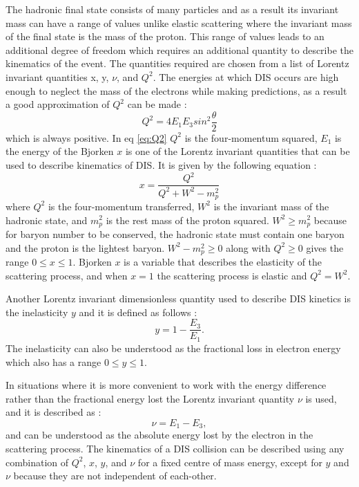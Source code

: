 \documentclass[journal, a4paper,11pt]{IEEEtran}
\begin{document}
The hadronic final state consists of many particles and as a result its invariant mass can have a range of values unlike elastic scattering where the invariant mass of the final state is the mass of the proton. This range of values leads to an additional degree of freedom which requires an additional quantity to describe the kinematics of the event. The quantities required are chosen from a list of Lorentz invariant quantities x, y, $\nu$, and $Q^2$. 
The energies at which DIS occurs are high enough to neglect the mass of the electrons while making predictions, as a result a good approximation of $Q^2$ can be made \cite{Modern}:
\begin{equation}
	Q^2 = 4E_1E_3sin^2\frac{\theta}{2}
	\label{eq:Q2}
\end{equation}
which is always positive. In eq \ref{eq:Q2} $Q^2$ is the four-momentum squared, $E_1$ is the energy of the
Bjorken $x$ is one of the Lorentz invariant quantities that can be used to describe kinematics of DIS. It is given by the following equation \cite{Modern}: 
\begin{equation}
	x = \frac{Q^2}{Q^2 + W^2 - m_p^2}
	\label{eq:x}
\end{equation}
where $Q^2$ is the four-momentum transferred, $W^2$ is the invariant mass of the hadronic state, and $m_p^2$ is the rest mass of the proton squared. $W^2 \geq m_p^2$ because for baryon number to be conserved, the hadronic state must contain one baryon and the proton is the lightest baryon. $W^2 - m_p^2 \geq 0$ along with $Q^2 \geq 0$ gives the range $0 \leq x \leq 1$. Bjorken $x$ is a variable that describes the elasticity of the scattering process, and when $x = 1$ the scattering process is elastic and $Q^2 = W^2$.

Another Lorentz invariant dimensionless quantity used to describe DIS kinetics is the inelasticity $y$ and it is defined as follows \cite{Modern}:
\begin{equation}
	y = 1-\frac{E_3}{E_1}.
	\label{eq:y}
\end{equation}
The inelasticity can also be understood as the fractional loss in electron energy which also has a range $0 \leq y \leq 1$.

In situations where it is more convenient to work with the energy difference rather than the fractional energy lost the Lorentz invariant quantity $\nu$ is used, and it is described as \cite{Modern}:
\begin{equation}
	\nu = E_1 - E_3,
	\label{eq:nu}
\end{equation}
and can be understood as the absolute energy lost by the electron in the scattering process.
The kinematics of a DIS collision can be described using any combination of $Q^2$, $x$, $y$, and $\nu$ for a fixed centre of mass energy, except for $y$ and $\nu$ because they are not independent of each-other.
\end{document}
